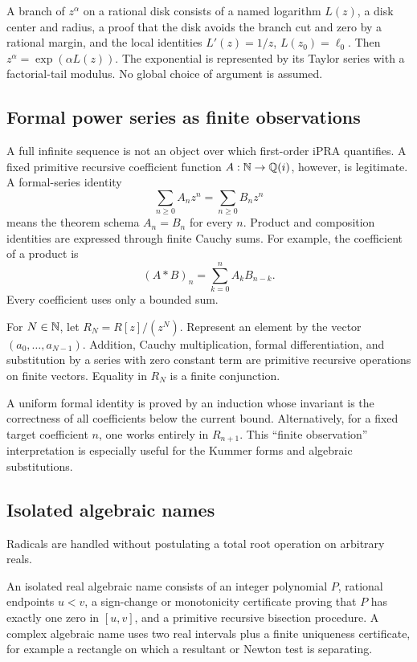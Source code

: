 A branch of \(z^\alpha\) on a rational disk consists of a named logarithm
\(L(z)\), a disk center and radius, a proof that the disk avoids the branch
cut and zero by a rational margin, and the local identities
\(L'(z)=1/z\), \(L(z_0)=\ell_0\).  Then
\(z^\alpha=\exp(\alpha L(z))\).  The exponential is represented by its
Taylor series with a factorial-tail modulus.  No global choice of argument is
assumed.

\subsection{Formal power series as finite observations}

A full infinite sequence is not an object over which first-order iPRA
quantifies.  A fixed primitive recursive coefficient function
\(A:\mathbb N\to\mathbb Q(i)\), however, is legitimate.  A formal-series identity
\[
  \sum_{n\ge0}A_nz^n=\sum_{n\ge0}B_nz^n
\]
means the theorem schema \(A_n=B_n\) for every \(n\).  Product and
composition identities are expressed through finite Cauchy sums.  For
example, the coefficient of a product is
\[
  (A*B)_n=\sum_{k=0}^{n}A_kB_{n-k}.
\]
Every coefficient uses only a bounded sum.

\begin{definition}\label{def:trunc-series}
For \(N\in\mathbb N\), let
\(R_N=R[z]/(z^N)\).  Represent an element by the vector
\((a_0,\ldots,a_{N-1})\).  Addition, Cauchy multiplication, formal
differentiation, and substitution by a series with zero constant term are
primitive recursive operations on finite vectors.  Equality in \(R_N\) is a
finite conjunction.
\end{definition}

A uniform formal identity is proved by an induction whose invariant is the
correctness of all coefficients below the current bound.  Alternatively, for
a fixed target coefficient \(n\), one works entirely in \(R_{n+1}\).  This
``finite observation'' interpretation is especially useful for the Kummer
forms and algebraic substitutions.

\subsection{Isolated algebraic names}

Radicals are handled without postulating a total root operation on arbitrary
reals.

\begin{definition}\label{def:alg-name}
An isolated real algebraic name consists of an integer polynomial \(P\),
rational endpoints \(u<v\), a sign-change or monotonicity certificate proving
that \(P\) has exactly one zero in \([u,v]\), and a primitive recursive
bisection procedure.  A complex algebraic name uses two real intervals plus a
finite uniqueness certificate, for example a rectangle on which a resultant
or Newton test is separating.
\end{definition}

